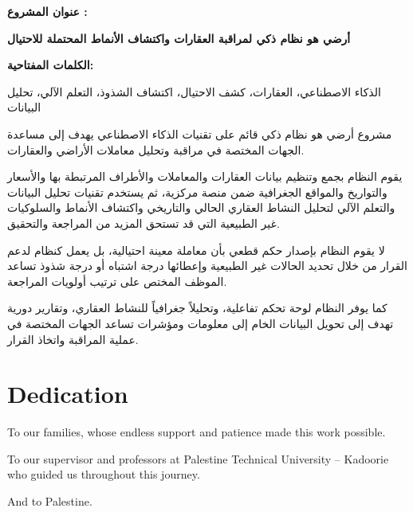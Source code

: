 \documentclass[12pt,a4paper,oneside]{report}
\begin{document}
\begin{Arabic}

\textbf{عنوان المشروع :}

\textbf{أرضي هو نظام ذكي لمراقبة العقارات واكتشاف الأنماط المحتملة للاحتيال}

\vspace{0.3cm}

\textbf{الكلمات المفتاحية:}

الذكاء الاصطناعي،
العقارات،
كشف الاحتيال،
اكتشاف الشذوذ،
التعلم الآلي،
تحليل البيانات

\vspace{0.5cm}

مشروع أرضي هو نظام ذكي قائم على تقنيات الذكاء الاصطناعي
يهدف إلى مساعدة الجهات المختصة في مراقبة وتحليل معاملات الأراضي
والعقارات.

يقوم النظام بجمع وتنظيم بيانات العقارات والمعاملات والأطراف
المرتبطة بها والأسعار والتواريخ والمواقع الجغرافية ضمن منصة
مركزية، ثم يستخدم تقنيات تحليل البيانات والتعلم الآلي لتحليل
النشاط العقاري الحالي والتاريخي واكتشاف الأنماط والسلوكيات
غير الطبيعية التي قد تستحق المزيد من المراجعة والتحقيق.

لا يقوم النظام بإصدار حكم قطعي بأن معاملة معينة احتيالية،
بل يعمل كنظام لدعم القرار من خلال تحديد الحالات غير الطبيعية
وإعطائها درجة اشتباه أو درجة شذوذ تساعد الموظف المختص على
ترتيب أولويات المراجعة.

كما يوفر النظام لوحة تحكم تفاعلية، وتحليلاً جغرافياً للنشاط
العقاري، وتقارير دورية تهدف إلى تحويل البيانات الخام إلى
معلومات ومؤشرات تساعد الجهات المختصة في عملية المراقبة
واتخاذ القرار.

\end{Arabic}

\clearpage


\chapter*{Dedication}


\vspace{2cm}

\begin{center}

\itshape

To our families, whose endless support and patience made this work
possible.

\vspace{0.7cm}

To our supervisor and professors at Palestine Technical University --
Kadoorie who guided us throughout this journey.

\vspace{0.7cm}

And to Palestine.

\end{center}
\end{document}
